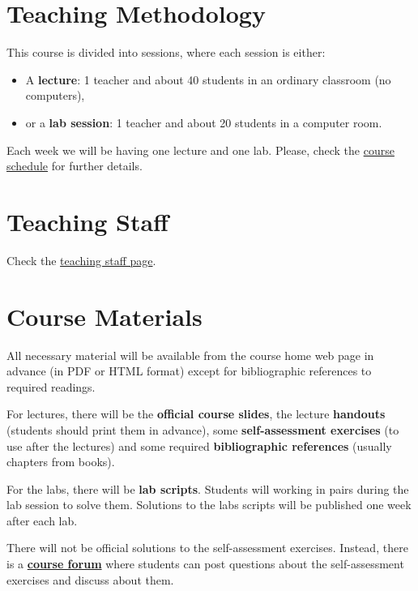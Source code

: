 \documentclass[11pt, a4paper, twoside]{article}
\begin{document}
\section{Teaching Methodology}

This course is divided into sessions, where each session is either:

\begin{itemize}

  \item A \textbf{lecture}: 1 teacher and about 40 students in an ordinary
    classroom (no computers),

  \item or a \textbf{lab session}: 1 teacher and about 20 students in a
    computer room.

\end{itemize}

Each week we will be having one lecture and one lab. Please, check the
\href{http://www.it.uc3m.es/alcortes/asig/1415/ps-ging/schedule.pdf}{course
schedule} for further details.

\section{Teaching Staff}

Check the
\href{http://it.uc3m.es/alcortes/asig/1415/ps-ging/staff.html}{teaching staff page}.

\section{Course Materials}

All necessary material will be available from the course home web page in
advance (in PDF or HTML format) except for bibliographic references to required
readings.

For lectures, there will be the \textbf{official course slides}, the lecture
\textbf{handouts} (students should print them in advance), some
\textbf{self-assessment exercises} (to use after the lectures) and some
required \textbf{bibliographic references} (usually chapters from books).

For the labs, there will be \textbf{lab scripts}. Students will working in
pairs during the lab session to solve them. Solutions to the labs scripts will
be published one week after each lab.

There will not be official solutions to the self-assessment exercises. Instead,
there is a \textbf{\href{http://it.uc3m.es}{course forum}} where students can
post questions about the self-assessment exercises and discuss about them.
\end{document}
